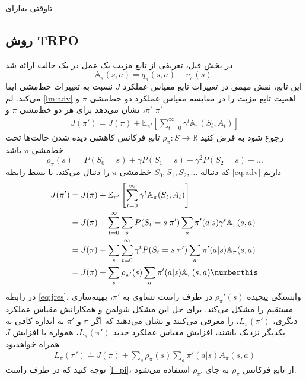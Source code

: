 

‌تاوقتی
‌به‌ازای
\subsection{روش TRPO}
در بخش قبل، تعریفی از تابع مزیت یک عمل در یک حالت ارائه شد
$$\mathbb{A}_\pi(s,a) = q_\pi(s,a) - v_\pi(s).$$
این تابع، نقش مهمی در تغییرات تابع مقیاس عملکرد $J$ نسبت به تغییرات خط‌مشی ایفا می‌کند. لم 
\ref{lm:adv}
اهمیت تابع مزیت را در مقایسه مقیاس عملکرد دو خط‌مشی $\pi$ و $\pi'$، نشان می‌دهد
برای هر دو خط‌مشی $\pi$ و $\pi'$
\begin{align}
J(\pi') = J(\pi) + \mathbb{E}_{\pi'}\left[\sum_{t=0}^{\infty} \gamma^t \mathbb{A}_\pi(S_t, A_t)\right]
\label{eq:adv}
\end{align}
\label{lm:adv}
رجوع شود به 
\cite{degris2012off}
فرض کنید
$\rho_\pi : S \longrightarrow \mathbb{R}$
تابع فرکانس کاهشی دیده شدن حالت‌ها تحت خط‌مشی $\pi$ باشد 
$$\rho_\pi(s) = P(S_0=s) + \gamma P(S_1=s) + \gamma^2 P(S_2=s) + ...$$
که دنباله 
$S_0, S_1, S_2, \dots$
 خط‌مشی $\pi$ را دنبال می‌کند.
با بسط رابطه
\ref{eq:adv}
داریم
\begin{align}
J(\pi')  & = J(\pi) + \mathbb{E}_{\pi'}\left[\sum_{t=0}^{\infty} \gamma^t \mathbb{A}_\pi(S_t, A_t)\right] \\
& = J(\pi) + \sum_{t=0}^{\infty} \sum_{s} P(S_t = s| \pi') \sum_{a} \pi'(a|s) \gamma^t \mathbb{A}_\pi(s,a) \\
& = J(\pi) + \sum_{s} \sum_{t=0}^{\infty} \gamma^t P(S_t = s | \pi') \sum_{a} \pi'(a|s) \mathbb{A}_\pi(s,a) \\
& = J(\pi) + \sum_{s} \rho_{\pi'}(s) \sum_{a} \pi'(a|s) \mathbb{A}_\pi(s,a) \numberthis
\label{eq:jres}
\end{align}
در رابطه 
\ref{eq:jres}،
وابستگی پیچیده  $\rho_\pi'(s)$ در طرف راست تساوی به $\pi'$، بهینه‌سازی مستقیم را مشکل می‌کند.
برای حل این مشکل شولمن و همکارانش 
\cite{schulman2015trust}
مقیاس عملکرد دیگری، $L_\pi(\pi')$، را معرفی می‌کنند و نشان می‌دهند که اگر $\pi$ و $\pi'$ به اندازه کافی به یکدیگر نزدیک باشند، افزایش مقیاس عملکرد جدید $L_\pi(\pi')$، همواره با افزایش $J$ همراه خواهد‌بود
\begin{align}
	L_\pi(\pi') \doteq J(\pi) + \sum_{s} \rho_{\pi}(s) \sum_{a} \pi'(a|s) A_\pi(s,a)
	\label{l_pi}
\end{align}
توجه کنید که در طرف راست 
\ref{l_pi}،
 از تابع فرکانس $\rho_\pi$ به جای 
 $\rho_{\pi'}$
استفاده می‌شود.

